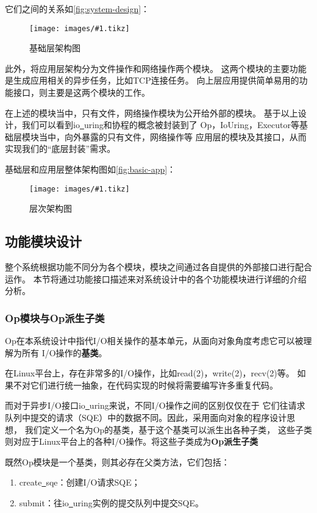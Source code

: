 \documentclass[supercite]{HustGraduPaper}
\newcommand{\cfig}[3]{
  \begin{figure}[htb]
    \centering
    \texttt{[image: images/\#1.tikz]}
    \caption{#3}
    \label{fig:#1}
  \end{figure}
}
\newcommand{\rfig}[1]{\autoref{fig:#1}}
\theoremstyle{definition}
\begin{document}
它们之间的关系如\rfig{system-design}：\par

\cfig{system-design}{0.9}{基础层架构图}

此外，将应用层架构分为文件操作和网络操作两个模块。
这两个模块的主要功能是生成应用相关的异步任务，比如TCP连接任务。
向上层应用提供简单易用的功能接口，则主要是这两个模块的工作。\par

在上述的模块当中，只有文件，网络操作模块为公开给外部的模块。
基于以上设计，我们可以看到io\underline{~}uring和协程的概念被封装到了
Op，IoUring，Executor等基础层模块当中，向外暴露的只有文件，网络操作等
应用层的模块及其接口，从而实现我们的“底层封装”需求。\par

基础层和应用层整体架构图如\rfig{basic-app}：\par

\cfig{basic-app}{0.5}{层次架构图}

\subsection{功能模块设计}
整个系统根据功能不同分为各个模块，模块之间通过各自提供的外部接口进行配合运作。
本节将通过功能接口描述来对系统设计中的各个功能模块进行详细的介绍分析。\par

\subsubsection{Op模块与Op派生子类}

Op在本系统设计中指代I/O相关操作的基本单元，从面向对象角度考虑它可以被理解为所有
I/O操作的\textbf{基类}。\par

在Linux平台上，存在非常多的I/O操作，比如read(2)，write(2)，recv(2)等。
如果不对它们进行统一抽象，在代码实现的时候将需要编写许多重复代码。\par

而对于异步I/O接口io\underline{~}uring来说，不同I/O操作之间的区别仅仅在于
它们往请求队列中提交的请求（SQE）中的数据不同。因此，采用面向对象的程序设计思想，
我们定义一个名为Op的基类，基于这个基类可以派生出各种子类，
这些子类则对应于Linux平台上的各种I/O操作。将这些子类成为\textbf{Op派生子类}\par

既然Op模块是一个基类，则其必存在父类方法，它们包括：

\begin{enumerate}
  \item create\underline{~}sqe：创建I/O请求SQE；
  \item submit：往io\underline{~}uring实例的提交队列中提交SQE。
\end{enumerate}
\end{document}

